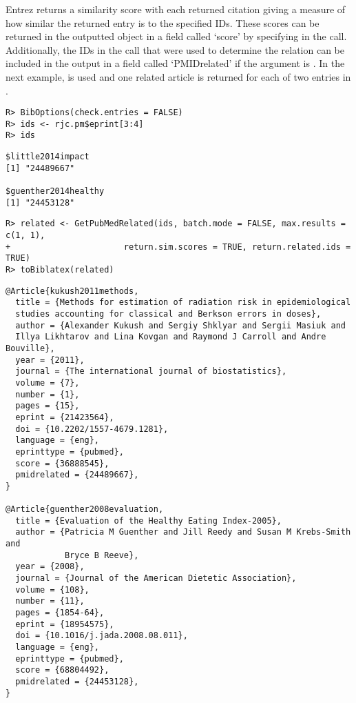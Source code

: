 \documentclass[article]{jss}\usepackage[]{graphicx}\usepackage[]{color}
\makeatletter
\newenvironment{kframe}{%
 \def\at@end@of@kframe{}%
 \ifinner\ifhmode%
  \def\at@end@of@kframe{\end{minipage}}%
  \begin{minipage}{\columnwidth}%
 \fi\fi%
 \def\FrameCommand##1{\hskip\@totalleftmargin \hskip-\fboxsep
 \colorbox{shadecolor}{##1}\hskip-\fboxsep
     \hskip-\linewidth \hskip-\@totalleftmargin \hskip\columnwidth}%
 \MakeFramed {\advance\hsize-\width
   \@totalleftmargin\z@ \linewidth\hsize
   \@setminipage}}%
 {\par\unskip\endMakeFramed%
 \at@end@of@kframe}
\newenvironment{knitrout}{}{} %
\makeatother
\begin{document}
Entrez returns a similarity score with each returned citation giving a measure of how similar the returned entry is to the specified IDs.  These scores can be returned in the outputted  object in a field called `score' by specifying  in the call.  Additionally, the IDs in the call that were used to determine the relation can be included in the output in a field called `PMIDrelated' if the argument  is .  In the next example,  is used and one related article is returned for each of two entries in .


\begin{knitrout}
\color{fgcolor}\begin{kframe}
\begin{verbatim}
R> BibOptions(check.entries = FALSE)
R> ids <- rjc.pm$eprint[3:4]
R> ids
\end{verbatim}
\begin{lstlisting}[showstringspaces=false,style=output,columns=fullflexible,breaklines=true,inputencoding=utf8,extendedchars=	rue,breakautoindent=false,breakindent=0pt,inputencoding=utf8]
$little2014impact
[1] "24489667"

$guenther2014healthy
[1] "24453128"
\end{lstlisting}\begin{verbatim}
R> related <- GetPubMedRelated(ids, batch.mode = FALSE, max.results = c(1, 1),
+                       return.sim.scores = TRUE, return.related.ids = TRUE)
R> toBiblatex(related)
\end{verbatim}
\begin{lstlisting}[showstringspaces=false,style=output,columns=fullflexible,breaklines=true,inputencoding=utf8,extendedchars=	rue,breakautoindent=false,breakindent=0pt,inputencoding=utf8]
@Article{kukush2011methods,
  title = {Methods for estimation of radiation risk in epidemiological 
  studies accounting for classical and Berkson errors in doses},
  author = {Alexander Kukush and Sergiy Shklyar and Sergii Masiuk and 
  Illya Likhtarov and Lina Kovgan and Raymond J Carroll and Andre Bouville},
  year = {2011},
  journal = {The international journal of biostatistics},
  volume = {7},
  number = {1},
  pages = {15},
  eprint = {21423564},
  doi = {10.2202/1557-4679.1281},
  language = {eng},
  eprinttype = {pubmed},
  score = {36888545},
  pmidrelated = {24489667},
}

@Article{guenther2008evaluation,
  title = {Evaluation of the Healthy Eating Index-2005},
  author = {Patricia M Guenther and Jill Reedy and Susan M Krebs-Smith and 
            Bryce B Reeve},
  year = {2008},
  journal = {Journal of the American Dietetic Association},
  volume = {108},
  number = {11},
  pages = {1854-64},
  eprint = {18954575},
  doi = {10.1016/j.jada.2008.08.011},
  language = {eng},
  eprinttype = {pubmed},
  score = {68804492},
  pmidrelated = {24453128},
}
\end{lstlisting}\end{kframe}
\end{knitrout}
\end{document}
